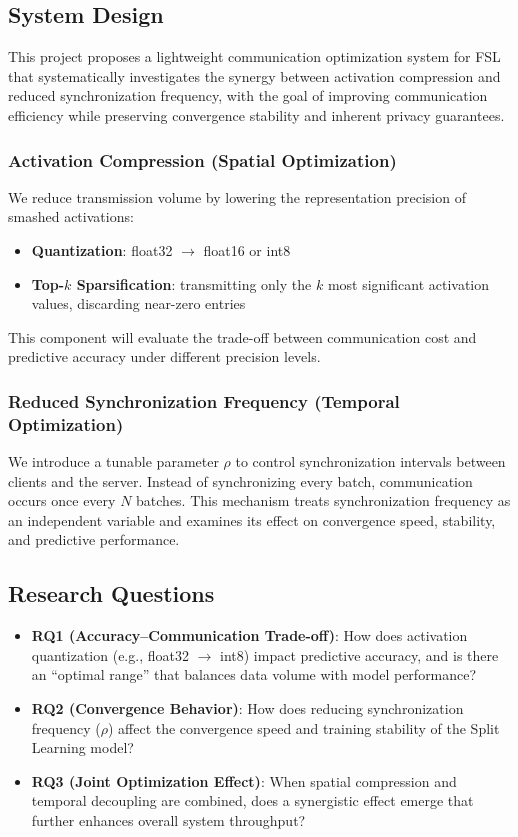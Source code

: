 \documentclass[conference]{IEEEtran}
\begin{document}
\subsection{System Design}

This project proposes a lightweight communication optimization system for FSL that systematically investigates the synergy between activation compression and reduced synchronization frequency, with the goal of improving communication efficiency while preserving convergence stability and inherent privacy guarantees.

\subsubsection{Activation Compression (Spatial Optimization)}

We reduce transmission volume by lowering the representation precision of smashed activations:
\begin{itemize}
  \item \textbf{Quantization}: float32 $\rightarrow$ float16 or int8
  \item \textbf{Top-$k$ Sparsification}: transmitting only the $k$ most significant activation values, discarding near-zero entries
\end{itemize}
This component will evaluate the trade-off between communication cost and predictive accuracy under different precision levels.

\subsubsection{Reduced Synchronization Frequency (Temporal Optimization)}

We introduce a tunable parameter $\rho$ to control synchronization intervals between clients and the server. Instead of synchronizing every batch, communication occurs once every $N$ batches. This mechanism treats synchronization frequency as an independent variable and examines its effect on convergence speed, stability, and predictive performance.

\subsection{Research Questions}

\begin{itemize}
  \item \textbf{RQ1 (Accuracy--Communication Trade-off)}: How does activation quantization (e.g., float32 $\rightarrow$ int8) impact predictive accuracy, and is there an ``optimal range'' that balances data volume with model performance?
  \item \textbf{RQ2 (Convergence Behavior)}: How does reducing synchronization frequency ($\rho$) affect the convergence speed and training stability of the Split Learning model?
  \item \textbf{RQ3 (Joint Optimization Effect)}: When spatial compression and temporal decoupling are combined, does a synergistic effect emerge that further enhances overall system throughput?
\end{itemize} 
\end{document}
